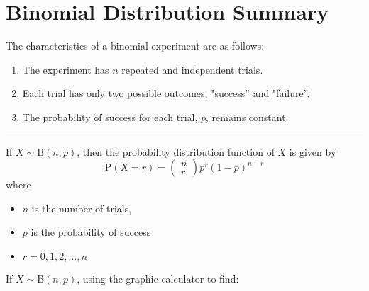 \documentclass[11pt,a4paper]{book}
\begin{document}
\newpage

\section{Binomial Distribution Summary}
The characteristics of a binomial experiment are as follows:

\begin{enumerate}[leftmargin=2cm]

\item  The experiment has $n$ repeated and independent trials.

\item  Each trial has only two possible outcomes, "success'' and
"failure''.

\item  The probability of success for each trial, $p$, remains
constant.

\end{enumerate}

\vspace{5pt}
\hrule
\vspace{6pt}

If $X\sim\text{B}\left(n,p\right)$, then the probability distribution
function of $X$ is given by 
\[
\text{P}\left(X=r\right)=\begin{pmatrix}n\\
r
\end{pmatrix}p^{r}\left(1-p\right)^{n-r}
\]
where

\begin{itemize}

\item  $n$ is the number of trials,

\item  $p$ is the probability of success

\item  $r=0,1,2,\ldots,n$

\end{itemize}

If $X\sim\text{B}\left(n,p\right)$, using the graphic calculator
to find:
\end{document}
